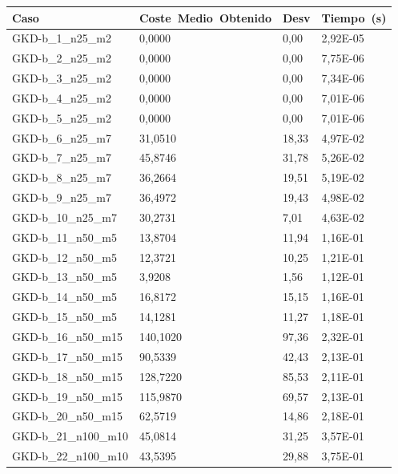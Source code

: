 \pagebreak

\begin{table}[!ht]%
    \centering    
    \begin{adjustbox}{height=12cm}
    \begin{tabular}{|l|l|l|l|}
    \hline
        Caso & Coste~Medio~Obtenido & Desv & Tiempo~(s) \\ \hline
		GKD-b\_1\_n25\_m2    & 0,0000   & 0,00   & 2,92E-05 \\ \hline
		GKD-b\_2\_n25\_m2    & 0,0000   & 0,00   & 7,75E-06 \\ \hline
		GKD-b\_3\_n25\_m2    & 0,0000   & 0,00   & 7,34E-06 \\ \hline
		GKD-b\_4\_n25\_m2    & 0,0000   & 0,00   & 7,01E-06 \\ \hline
		GKD-b\_5\_n25\_m2    & 0,0000   & 0,00   & 7,01E-06 \\ \hline
		GKD-b\_6\_n25\_m7    & 31,0510  & 18,33  & 4,97E-02 \\ \hline
		GKD-b\_7\_n25\_m7    & 45,8746  & 31,78  & 5,26E-02 \\ \hline
		GKD-b\_8\_n25\_m7    & 36,2664  & 19,51  & 5,19E-02 \\ \hline
		GKD-b\_9\_n25\_m7    & 36,4972  & 19,43  & 4,98E-02 \\ \hline
		GKD-b\_10\_n25\_m7   & 30,2731  & 7,01   & 4,63E-02 \\ \hline
		GKD-b\_11\_n50\_m5   & 13,8704  & 11,94  & 1,16E-01 \\ \hline
		GKD-b\_12\_n50\_m5   & 12,3721  & 10,25  & 1,21E-01 \\ \hline
		GKD-b\_13\_n50\_m5   & 3,9208   & 1,56   & 1,12E-01 \\ \hline
		GKD-b\_14\_n50\_m5   & 16,8172  & 15,15  & 1,16E-01 \\ \hline
		GKD-b\_15\_n50\_m5   & 14,1281  & 11,27  & 1,18E-01 \\ \hline
		GKD-b\_16\_n50\_m15  & 140,1020 & 97,36  & 2,32E-01 \\ \hline
		GKD-b\_17\_n50\_m15  & 90,5339  & 42,43  & 2,13E-01 \\ \hline
		GKD-b\_18\_n50\_m15  & 128,7220 & 85,53  & 2,11E-01 \\ \hline
		GKD-b\_19\_n50\_m15  & 115,9870 & 69,57  & 2,13E-01 \\ \hline
		GKD-b\_20\_n50\_m15  & 62,5719  & 14,86  & 2,18E-01 \\ \hline
		GKD-b\_21\_n100\_m10 & 45,0814  & 31,25  & 3,57E-01 \\ \hline
		GKD-b\_22\_n100\_m10 & 43,5395  & 29,88  & 3,75E-01 \\ \hline

\end{tabular}
\end{adjustbox}
\end{table}
